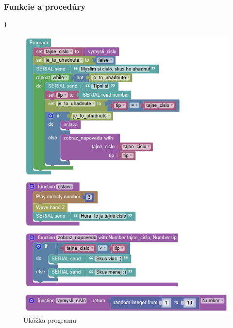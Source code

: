\subsubsection{Funkcie a procedúry}

\ref{obr:guess-number}

\begin{figure}[h!]
\centerline{\includegraphics[width=1\textwidth]{images/guess-number}}
\caption[Ukážka programu ]{Ukážka programu }
\label{obr:guess-number}
\end{figure}


















